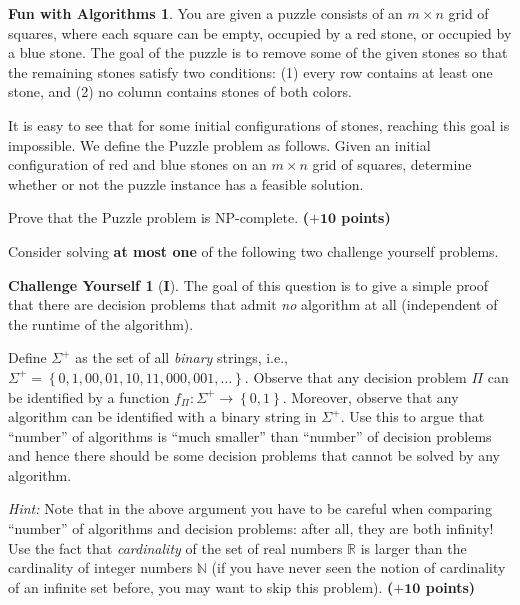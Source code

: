 \documentclass{article}
\theoremstyle{definition}
\newtheorem*{fun}{Fun with Algorithms}
\newtheorem*{challenge}{Challenge Yourself}
\newcommand{\grade}[1]{\hfill{\textbf{($\mathbf{#1}$ points)}}}
\newcommand{\set}[1]{\ensuremath{\left\{ #1 \right\}}}
\begin{document}
\begin{fun}
	You are given a puzzle consists of an $m \times n$ grid of squares, where each
square can be empty, occupied by a red stone, or occupied by a blue stone. The goal of the puzzle
is to remove some of the given stones so that the remaining stones satisfy two conditions: (1) every row contains at least one stone,
and (2) no column contains stones of both colors. 

It is easy to see that for some initial configurations of stones, reaching this goal is impossible. 
We define the Puzzle problem as follows. Given an initial configuration of red and blue stones on an $m \times n$ grid of squares,
determine whether or not the puzzle instance has a feasible solution. 

Prove that the Puzzle problem is NP-complete. \grade{+10}
\end{fun}



Consider solving \textbf{at most one} of the following two challenge yourself problems. 

\bigskip

\begin{challenge}[\textbf{I}] 
	The goal of this question is to give a simple proof that there are decision problems that admit \emph{no} algorithm at all (independent of the runtime of the algorithm). 
	
	Define $\Sigma^+$ as the set of all \emph{binary} strings, i.e., $\Sigma^{+} = \set{0,1,00,01,10,11,000,001,\ldots}$. Observe that any decision problem $\Pi$ can be identified by a function $f_{\Pi} : \Sigma^{+} \rightarrow \set{0,1}$. 
	Moreover, observe that any algorithm can be identified with a binary string in $\Sigma^{+}$. Use this to argue that ``number'' of algorithms is ``much smaller'' than ``number'' of decision problems and hence there should be some decision problems
	that cannot be solved by any algorithm. 
	
	\emph{Hint:} Note that in the above argument you have to be careful when comparing ``number'' of algorithms and decision problems: after all, they are both infinity! Use the fact that \emph{cardinality} of the set of real numbers $\mathbb{R}$ is larger than the cardinality of integer numbers $\mathbb{N}$ (if you have never seen the notion of cardinality of an infinite set before, you may want to skip this problem).  \grade{+10}
	
\end{challenge}

\bigskip
\end{document}
